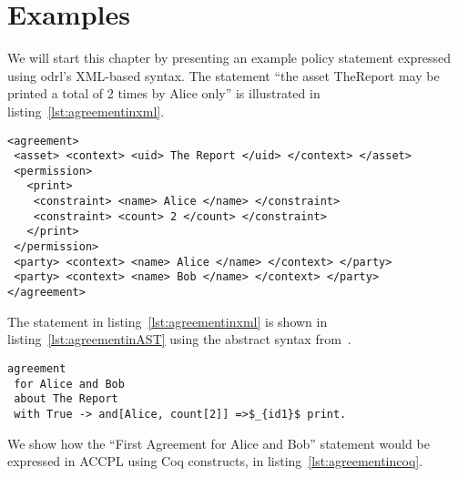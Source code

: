 \chapter{Examples}

We will start this chapter by presenting an example policy statement expressed using \ac{odrl}'s XML-based syntax. The statement ``the asset TheReport may be printed a total of 2 times by Alice only'' is illustrated in listing~\ref{lst:agreementinxml}. 

\lstset{language=XML}
\begin{lstlisting}[caption={First Agreement for Alice and Bob in XML}, label={lst:agreementinxml}]
<agreement>
 <asset> <context> <uid> The Report </uid> </context> </asset>
 <permission>
   <print>
    <constraint> <name> Alice </name> </constraint>
    <constraint> <count> 2 </count> </constraint>
   </print>
 </permission>
 <party> <context> <name> Alice </name> </context> </party>
 <party> <context> <name> Bob </name> </context> </party>
</agreement>
\end{lstlisting}

The statement in listing~\ref{lst:agreementinxml} is shown in listing~\ref{lst:agreementinAST} using the abstract syntax from~\cite{pucella2006}.

\lstset{language=Pucella2006}
\begin{lstlisting}[frame=single, caption={First Agreement for Alice and Bob}, label={lst:agreementinAST}, mathescape]
agreement
 for Alice and Bob 
 about The Report 
 with True -> and[Alice, count[2]] =>$_{id1}$ print.
\end{lstlisting}

We show how the ``First Agreement for Alice and Bob'' statement would be expressed in \ac{ACCPL} using Coq constructs, in listing~\ref{lst:agreementincoq}.

